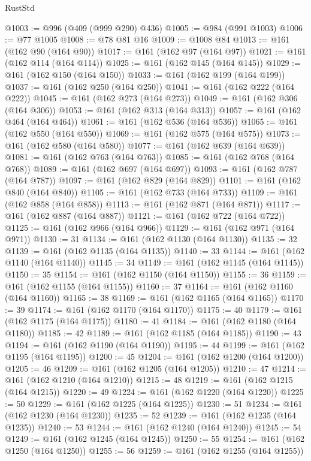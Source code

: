 \begin{lexlean}{RustStd}
\begin{coremodule}
{\begin{coremodule}
{{{{{{{{{{{{{{{{{{{{{{{{{{{{{{{{{{{{{{{{{{{{{{{{{{{{{{{{{{{{@1003 := @996 (@409 (@999 @290) @436)
@1005 := @984 (@991 @1003)
@1006 := @77 @1005
@1008 := @78 @81 @16
@1009 := @1008 @84
@1013 := @161 (@162 @90 (@164 @90))
@1017 := @161 (@162 @97 (@164 @97))
@1021 := @161 (@162 @114 (@164 @114))
@1025 := @161 (@162 @145 (@164 @145))
@1029 := @161 (@162 @150 (@164 @150))
@1033 := @161 (@162 @199 (@164 @199))
@1037 := @161 (@162 @250 (@164 @250))
@1041 := @161 (@162 @222 (@164 @222))
@1045 := @161 (@162 @273 (@164 @273))
@1049 := @161 (@162 @306 (@164 @306))
@1053 := @161 (@162 @313 (@164 @313))
@1057 := @161 (@162 @464 (@164 @464))
@1061 := @161 (@162 @536 (@164 @536))
@1065 := @161 (@162 @550 (@164 @550))
@1069 := @161 (@162 @575 (@164 @575))
@1073 := @161 (@162 @580 (@164 @580))
@1077 := @161 (@162 @639 (@164 @639))
@1081 := @161 (@162 @763 (@164 @763))
@1085 := @161 (@162 @768 (@164 @768))
@1089 := @161 (@162 @697 (@164 @697))
@1093 := @161 (@162 @787 (@164 @787))
@1097 := @161 (@162 @829 (@164 @829))
@1101 := @161 (@162 @840 (@164 @840))
@1105 := @161 (@162 @733 (@164 @733))
@1109 := @161 (@162 @858 (@164 @858))
@1113 := @161 (@162 @871 (@164 @871))
@1117 := @161 (@162 @887 (@164 @887))
@1121 := @161 (@162 @722 (@164 @722))
@1125 := @161 (@162 @966 (@164 @966))
@1129 := @161 (@162 @971 (@164 @971))
@1130 := 31
@1134 := @161 (@162 @1130 (@164 @1130))
@1135 := 32
@1139 := @161 (@162 @1135 (@164 @1135))
@1140 := 33
@1144 := @161 (@162 @1140 (@164 @1140))
@1145 := 34
@1149 := @161 (@162 @1145 (@164 @1145))
@1150 := 35
@1154 := @161 (@162 @1150 (@164 @1150))
@1155 := 36
@1159 := @161 (@162 @1155 (@164 @1155))
@1160 := 37
@1164 := @161 (@162 @1160 (@164 @1160))
@1165 := 38
@1169 := @161 (@162 @1165 (@164 @1165))
@1170 := 39
@1174 := @161 (@162 @1170 (@164 @1170))
@1175 := 40
@1179 := @161 (@162 @1175 (@164 @1175))
@1180 := 41
@1184 := @161 (@162 @1180 (@164 @1180))
@1185 := 42
@1189 := @161 (@162 @1185 (@164 @1185))
@1190 := 43
@1194 := @161 (@162 @1190 (@164 @1190))
@1195 := 44
@1199 := @161 (@162 @1195 (@164 @1195))
@1200 := 45
@1204 := @161 (@162 @1200 (@164 @1200))
@1205 := 46
@1209 := @161 (@162 @1205 (@164 @1205))
@1210 := 47
@1214 := @161 (@162 @1210 (@164 @1210))
@1215 := 48
@1219 := @161 (@162 @1215 (@164 @1215))
@1220 := 49
@1224 := @161 (@162 @1220 (@164 @1220))
@1225 := 50
@1229 := @161 (@162 @1225 (@164 @1225))
@1230 := 51
@1234 := @161 (@162 @1230 (@164 @1230))
@1235 := 52
@1239 := @161 (@162 @1235 (@164 @1235))
@1240 := 53
@1244 := @161 (@162 @1240 (@164 @1240))
@1245 := 54
@1249 := @161 (@162 @1245 (@164 @1245))
@1250 := 55
@1254 := @161 (@162 @1250 (@164 @1250))
@1255 := 56
@1259 := @161 (@162 @1255 (@164 @1255))
}}}}}}}}}}}}}}}}}}}}}}}}}}}}}}}}}}}}}}}}}}}}}}}}}}}}}}}}}}}}
\end{coremodule}}
\end{coremodule}
\end{lexlean}
